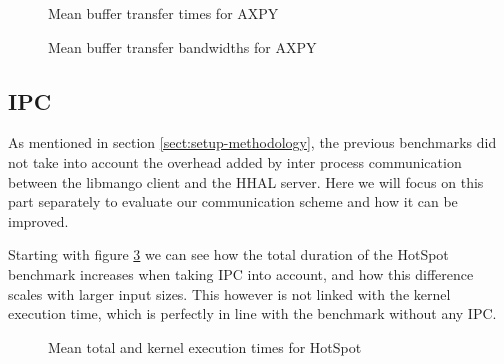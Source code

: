 \begin{figure}%
    \centering
    \qquad
    \captionsetup{justification=centering}
    \caption{Mean buffer transfer times for AXPY}%
    \label{fig:axpy_buffer_transfers_mean}%
\end{figure}

\begin{figure}%
    \centering
    \qquad
    \captionsetup{justification=centering}
    \caption{Mean buffer transfer bandwidths for AXPY}%
    \label{fig:axpy_buffer_transfers_bandwidth_mean}%
\end{figure}

\subsection{IPC}

As mentioned in section \ref{sect:setup-methodology}, the previous benchmarks did not take into account the overhead added by inter process communication between the libmango client and the HHAL server. Here we will focus on this part separately to evaluate our communication scheme and how it can be improved.

Starting with figure \ref{fig:hotspot_total_and_kernel_executions_mean_ipc} we can see how the total duration of the HotSpot benchmark increases when taking IPC into account, and how this difference scales with larger input sizes. This however is not linked with the kernel execution time, which is perfectly in line with the benchmark without any IPC. 

\begin{figure}%
    \centering
    \qquad
    \captionsetup{justification=centering}
    \caption{Mean total and kernel execution times for HotSpot}%
    \label{fig:hotspot_total_and_kernel_executions_mean_ipc}%
\end{figure}

